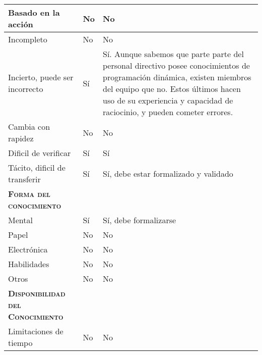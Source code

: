 \begin{table}[H]
{\begin{tabular}{|l|l|l|}
		Basado en la acción & \multicolumn{1}{p{1.0cm}|}{No} & \multicolumn{1}{p{13.0cm}|}{No}\\
		\hline

		Incompleto & \multicolumn{1}{p{1.0cm}|}{No} & \multicolumn{1}{p{13.0cm}|}{No}\\
		\hline

		Incierto, puede ser incorrecto & \multicolumn{1}{p{1.0cm}|}{Sí} & \multicolumn{1}{p{13.0cm}|}{Sí. Aunque sabemos que parte parte del personal directivo posee conocimientos de programación dinámica, existen miembros del equipo que no. Estos últimos hacen uso de su experiencia y capacidad de raciocinio, y pueden cometer errores.}\\
		\hline

		Cambia con rapidez & \multicolumn{1}{p{1.0cm}|}{No} & \multicolumn{1}{p{13.0cm}|}{No}\\
		\hline

		Dificil de verificar & \multicolumn{1}{p{1.0cm}|}{Sí} & \multicolumn{1}{p{13.0cm}|}{Sí}\\
		\hline

		Tácito, dificil de transferir& \multicolumn{1}{p{1.0cm}|}{Sí} & \multicolumn{1}{p{13.0cm}|}{Sí, debe estar formalizado y validado}\\
		\hline

		\textsc {\textbf{Forma del conocimiento}}& \multicolumn{1}{p{1.0cm}|}{} & \multicolumn{1}{p{13.0cm}|}{}\\
		\hline

		Mental & \multicolumn{1}{p{1.0cm}|}{Sí} & \multicolumn{1}{p{13.0cm}|}{Sí, debe formalizarse}\\
		\hline

		Papel & \multicolumn{1}{p{1.0cm}|}{No} & \multicolumn{1}{p{13.0cm}|}{No}\\
		\hline

		Electrónica & \multicolumn{1}{p{1.0cm}|}{No} & \multicolumn{1}{p{13.0cm}|}{No}\\
		\hline

		Habilidades & \multicolumn{1}{p{1.0cm}|}{No} & \multicolumn{1}{p{13.0cm}|}{No}\\
		\hline

		Otros & \multicolumn{1}{p{1.0cm}|}{No} & \multicolumn{1}{p{13.0cm}|}{No}\\
		\hline

		\textsc {\textbf{Disponibilidad del Conocimiento}} & \multicolumn{1}{p{1.0cm}|}{} & \multicolumn{1}{p{13.0cm}|}{}\\
		\hline
		Limitaciones de tiempo& \multicolumn{1}{p{1.0cm}|}{No} & \multicolumn{1}{p{13.0cm}|}{No}\\
		\hline


\end{tabular}}
\end{table}
